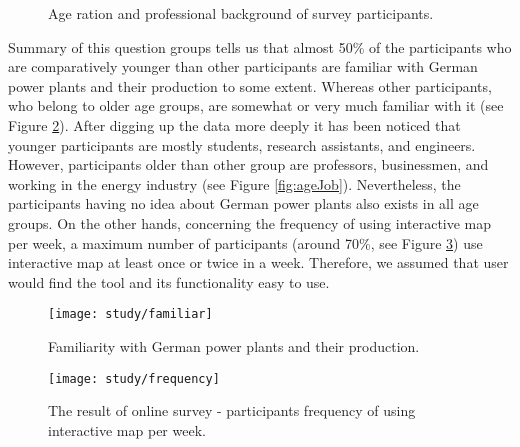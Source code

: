 \begin{figure} [h]
  \begin{center}
\hfill
{}
\hfill
\caption{Age ration and professional background of survey participants.}
\label{fig:participantBack}
\end{center}
\end{figure}

Summary of this question groups tells us that almost 50\% of the participants who are comparatively younger than other participants are familiar with German power plants and their production to some extent.  Whereas other participants, who belong to older age groups, are somewhat or very much familiar with it (see Figure \ref{fig:familiar}). After digging up the data more deeply it has been noticed that younger participants are mostly students, research assistants, and engineers. However, participants older than other group are professors, businessmen, and working in the energy industry (see Figure \ref{fig:ageJob}). Nevertheless, the participants having no idea about German power plants also exists in all age groups. On the other hands, concerning the frequency of using interactive map per week, a maximum number of participants (around 70\%, see Figure \ref{fig:mapUsage}) use interactive map at least once or twice in a week. Therefore, we assumed that user would find the tool and its functionality easy to use.

\begin{figure}
  \begin{center}
    \texttt{[image: study/familiar]}
    \caption{Familiarity with German power plants and their production.}
    \label{fig:familiar}
  \end{center}
\end{figure}

\begin{figure} 
  \begin{center}
    \texttt{[image: study/frequency]}
    \caption[participants frequency of using interactive map per week]{The result of online survey - participants frequency of using interactive map per week.}
    \label{fig:mapUsage}
  \end{center}
\end{figure}


